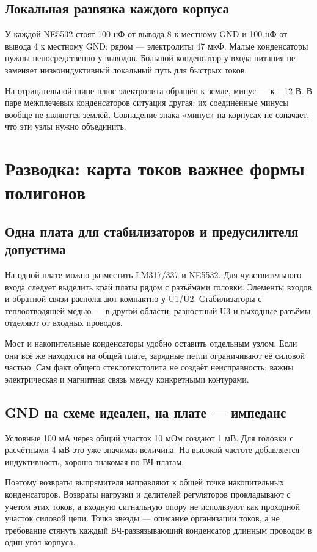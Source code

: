 \documentclass[a4paper,11pt]{article}
\begin{document}
\subsection{Локальная развязка каждого корпуса}

У каждой NE5532 стоят 100 нФ от вывода 8 к местному GND и 100 нФ от вывода 4
к местному GND; рядом — электролиты 47 мкФ. Малые конденсаторы нужны
непосредственно у выводов. Большой конденсатор у входа питания не заменяет
низкоиндуктивный локальный путь для быстрых токов.

На отрицательной шине плюс электролита обращён к земле, минус — к −12 В.
В паре межплечевых конденсаторов ситуация другая: их соединённые минусы
вообще не являются землёй. Совпадение знака «минус» на корпусах не означает,
что эти узлы нужно объединить.

\section{Разводка: карта токов важнее формы полигонов}

\subsection{Одна плата для стабилизаторов и предусилителя допустима}

На одной плате можно разместить LM317/337 и NE5532.
Для чувствительного входа следует выделить край платы рядом с разъёмами головки.
Элементы входов и обратной связи располагают компактно у U1/U2.
Стабилизаторы с теплоотводящей медью — в другой области; разностный U3 и
выходные разъёмы отделяют от входных проводов.

Мост и накопительные конденсаторы удобно оставить отдельным узлом.
Если они всё же находятся на общей плате, зарядные петли ограничивают её
силовой частью. Сам факт общего стеклотекстолита не создаёт неисправность;
важны электрическая и магнитная связь между конкретными контурами.

\subsection{GND на схеме идеален, на плате — импеданс}

Условные 100 мА через общий участок 10 мОм создают 1 мВ.
Для головки с расчётными 4 мВ это уже значимая величина.
На высокой частоте добавляется индуктивность, хорошо знакомая по ВЧ-платам.

Поэтому возвраты выпрямителя направляют к общей точке накопительных конденсаторов.
Возвраты нагрузки и делителей регуляторов прокладывают с учётом этих токов,
а входную сигнальную опору не используют как проходной участок силовой цепи.
Точка звезды — описание организации токов, а не требование стянуть
каждый ВЧ-развязывающий конденсатор длинным проводом в один угол корпуса.
\end{document}
